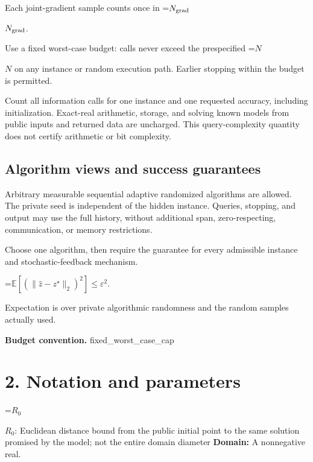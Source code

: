 \documentclass[10pt,a4paper]{article}
\newcommand{\AtlasMath}[1]{\par\begingroup\centering\setbox0=\hbox{$\displaystyle #1$}\ifdim\wd0>1.4\linewidth\typeout{ATLAS WIDE FORMULA: \the\wd0}\fi\ifdim\wd0>\linewidth\resizebox{\linewidth}{!}{\box0}\else\box0\fi\par\endgroup}
\newcommand{\AtlasInlineMath}[1]{\begingroup\setbox0=\hbox{$#1$}\ifdim\wd0>.4\linewidth\endgroup\AtlasMath{#1}\else\endgroup$#1$\fi}
\begin{document}
Each joint-gradient sample counts once in \AtlasInlineMath{N_{\rm grad}}.



Use a fixed worst-case budget: calls never exceed the prespecified \AtlasInlineMath{N} on any instance or random execution path. Earlier stopping within the budget is permitted.



Count all information calls for one instance and one requested accuracy, including initialization. Exact-real arithmetic, storage, and solving known models from public inputs and returned data are uncharged. This query-complexity quantity does not certify arithmetic or bit complexity.



\subsection{Algorithm views and success guarantees}


Arbitrary measurable sequential adaptive randomized algorithms are allowed. The private seed is independent of the hidden instance. Queries, stopping, and output may use the full history, without additional span, zero-respecting, communication, or memory restrictions.



Choose one algorithm, then require the guarantee for every admissible instance and stochastic-feedback mechanism.




\AtlasMath{\mathbb{E}\!\left[\left(\|\widehat{z}-z^\star\|_2\right)^2\right]\le\varepsilon^2.}




Expectation is over private algorithmic randomness and the random samples actually used.



\textbf{Budget convention.} fixed\_worst\_case\_cap



\section{2. Notation and parameters}


\AtlasInlineMath{R_0}: Euclidean distance bound from the public initial point to the same solution promised by the model; not the entire domain diameter \textbf{Domain:} A nonnegative real.
\end{document}
